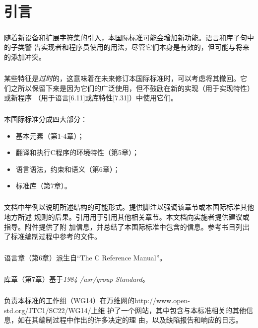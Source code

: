 \chapter*{引言}

\setcounter{paragraph}{0}

\paragraph{}
随着新设备和扩展字符集的引入，本国际标准可能会增加新功能。语言和库子句中的子类警
告实现者和程序员使用的用法，尽管它们本身是有效的，但可能与将来的添加冲突。

\paragraph{}
某些特征是\textit{过时}的，这意味着在未来修订本国际标准时，可以考虑将其撤回。它
们之所以保留下来是因为它们的广泛使用，但不鼓励在新的实现（用于实现特性）或新程序
（用于语言[6.11]或库特性[7.31]）中使用它们。

\paragraph{}
本国际标准分成四大部分：
\begin{itemize}
  \item{基本元素（第1-4章）；}
  \item{翻译和执行C程序的环境特性（第5章）；}
  \item{语言语法，约束和语义（第6章）；}
  \item{标准库（第7章）。}
\end{itemize}

\paragraph{}
文档中举例以说明所述结构的可能形式。提供脚注以强调该章节或本国际标准其他地方所述
规则的后果。引用用于引用其他相关章节。本文档向实施者提供建议或指导。附件提供了附
加信息，并总结了本国际标准中包含的信息。参考书目列出了标准编制过程中参考的文件。

\paragraph{}
语言章（第6章）派生自``The C Reference Manual''。

\paragraph{}
库章（第7章）基于\textit{1984 /usr/group Standard}。

\paragraph{}
负责本标准的工作组（WG14）在万维网的http://www.open-std.org/JTC1/SC22/WG14/上维
护了一个网站，其中包含与本标准相关的其他信息，如在其编制过程中作出的许多决定的理
由，以及缺陷报告和响应的日志。
